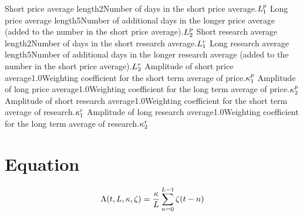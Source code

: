 \documentclass{article}
\begin{document}
\logo
{} %
\tblofcontents


{Short price average length}{2}{Number of days in the short price average.}{$L_{1}^{p}$}
{Long price average length}{5}{Number of additional days in the longer price average (added to the number in the short price average).}{$L_{2}^{p}$}
{Short research average length}{2}{Number of days in the short research average.}{$L_{1}^{r}$}
{Long research average length}{5}{Number of additional days in the longer research average (added to the number in the short price average).}{$L_{2}^{r}$}
{Amplitude of short price average}{1.0}{Weighting coefficient for the short term average of price.}{$\kappa_{1}^{p}$}
{Amplitude of long price average}{1.0}{Weighting coefficient for the long term average of price.}{$\kappa_{2}^{p}$}
{Amplitude of short research average}{1.0}{Weighting coefficient for the short term average of research.}{$\kappa_{1}^{r}$}
{Amplitude of long research average}{1.0}{Weighting coefficient for the long term average of research.}{$\kappa_{2}^{r}$}
\stoptable


\section{Equation}

\begin{equation}
\Lambda(t, L, \kappa, \zeta) = \frac{\kappa}{L} \sum_{n=0}^{L-1} \zeta(t - n)
\end{equation}
\end{document}
